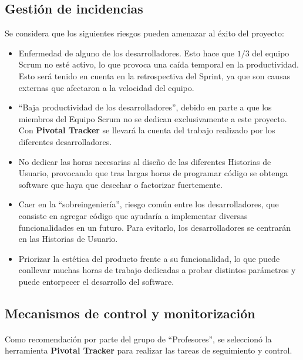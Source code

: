 \documentclass{article}
\begin{document}
       	\subsection{Gestión de incidencias}
        Se considera que los siguientes riesgos pueden amenazar al éxito del proyecto:
          \begin{itemize}
          	  \item Enfermedad de alguno de los desarrolladores. Esto hace que $1/3$ del equipo Scrum no esté activo, lo que provoca una caída temporal en la productividad. Esto será tenido en cuenta en la retrospectiva del Sprint, ya que son causas externas que afectaron a la velocidad del equipo.
              \item ``Baja productividad de los desarrolladores'', debido en parte a que los miembros del Equipo Scrum no se dedican exclusivamente a este proyecto. Con \textbf{Pivotal Tracker} se llevará la cuenta del trabajo realizado por los diferentes desarrolladores.
              \item No dedicar las horas necesarias al diseño de las diferentes Historias de Usuario, provocando que tras largas horas de programar código se obtenga software que haya que desechar o factorizar fuertemente.
              \item Caer en la ``sobreingeniería'', riesgo común entre los desarrolladores, que consiste en agregar código que ayudaría a implementar diversas funcionalidades en un futuro. Para evitarlo, los desarrolladores se centrarán en las Historias de Usuario.
              \item Priorizar la estética del producto frente a su funcionalidad, lo que puede conllevar muchas horas de trabajo dedicadas a probar distintos parámetros y puede entorpecer el desarrollo del software.
          \end{itemize}
       	\subsection{Mecanismos de control y monitorización}
		\paragraph{}
        Como recomendación por parte del grupo de ``Profesores'', se seleccionó la herramienta \textbf{Pivotal Tracker} para realizar las tareas de seguimiento y control.
\end{document}
